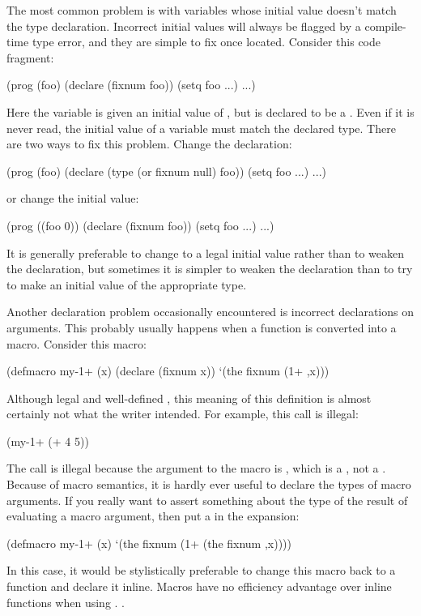 {The most common problem is with variables whose initial value doesn't match the
type declaration.  Incorrect initial values will always be flagged by a
compile-time type error, and they are simple to fix once located.  Consider
this code fragment:
\begin{example}
(prog (foo)
  (declare (fixnum foo))
  (setq foo ...)
  ...)
\end{example}
Here the variable  is given an initial value of \false, but is declared
to be a .  Even if it is never read, the initial value of a variable
must match the declared type.  There are two ways to fix this problem.  Change
the declaration:
\begin{example}
(prog (foo)
  (declare (type (or fixnum null) foo))
  (setq foo ...)
  ...)
\end{example}
or change the initial value:
\begin{example}
(prog ((foo 0))
  (declare (fixnum foo))
  (setq foo ...)
  ...)
\end{example}
It is generally preferable to change to a legal initial value rather than to
weaken the declaration, but sometimes it is simpler to weaken the
declaration than to try to make an initial value of the appropriate type.


Another declaration problem occasionally encountered is incorrect declarations
on  arguments.  This probably usually happens when a function is
converted into a macro.   Consider this macro:
\begin{lisp}
(defmacro my-1+ (x)
  (declare (fixnum x))
  `(the fixnum (1+ ,x)))
\end{lisp}
Although legal and well-defined \clisp, this meaning of this definition is
almost certainly not what the writer intended.  For example, this call is
illegal:
\begin{lisp}
(my-1+ (+ 4 5))
\end{lisp}
The call is illegal because the argument to the macro is , which
is a , not a .  Because of macro semantics, it is hardly ever
useful to declare the types of macro arguments.  If you really want to assert
something about the type of the result of evaluating a macro argument, then put
a  in the expansion:
\begin{lisp}
(defmacro my-1+ (x)
  `(the fixnum (1+ (the fixnum ,x))))
\end{lisp}
In this case, it would be stylistically preferable to change this macro back to
a function and declare it inline.  Macros have no efficiency advantage over
inline functions when using \Python.  .


}
